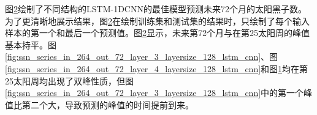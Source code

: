 \begin{figure}[!htbp]
\begin{subfigure}[b]{1.0\textwidth}
    \label{fig:ssn_series_in_264_out_72_layer_5_layersize_256_lstm_cnn}
    \end{subfigure}
  \vspace{-2cm}
  \label{fig:ssn_series_in_264_out_72_lstm_cnn}
\end{figure}

图\ref{fig:ssn_series_in_264_out_72_lstm_cnn}绘制了不同结构的LSTM-1DCNN的最佳模型预测未来72个月的太阳黑子数。为了更清晰地展示结果，图\ref{fig:ssn_series_in_264_out_72_lstm_cnn}在绘制训练集和测试集的结果时，只绘制了每个输入样本的第一个和最后一个预测值。图\ref{fig:ssn_series_in_264_out_72_lstm_cnn}显示，未来第72个月与在第25太阳周的峰值基本持平。图\ref{fig:ssn_series_in_264_out_72_layer_3_layersize_128_lstm_cnn}、图\ref{fig:ssn_series_in_264_out_72_layer_4_layersize_128_lstm_cnn}和图\ref{fig:ssn_series_in_264_out_72_layer_5_layersize_256_lstm_cnn}均在第25太阳周均出现了双峰性质，但图\ref{fig:ssn_series_in_264_out_72_layer_3_layersize_128_lstm_cnn}中的第一个峰值比第二个大，导致预测的峰值的时间提前到来。

